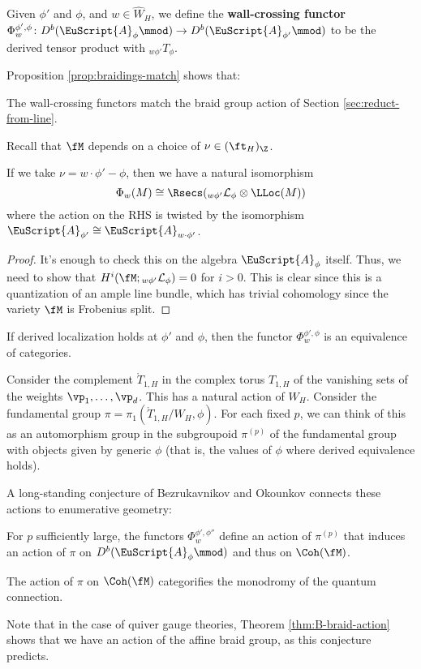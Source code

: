 \begin{definition}
Given $\phi'$ and $\phi$, and $w\in \widehat{W}_H$, we define the {\bf wall-crossing functor} $\Phi_w^{\phi',\phi}\colon D^b(\EuScript{A}_{\phi}\mmod) \to D^b(\EuScript{A}_{\phi'}\mmod)$ to be the derived tensor product with ${}_{w\phi'}T_{\phi}$.
\end{definition}
Proposition \ref{prop:braidings-match} shows that:
\begin{corollary}\label{cor:braidings-match}
  The wall-crossing functors match the braid group action of Section
  \ref{sec:reduct-from-line}.
\end{corollary}
Recall that $\fM$ depends on a choice of $\nu\in (\ft_H)_{\Z}$.  
\begin{proposition}
If we take $\nu=w\cdot \phi'-\phi$, then we have a natural isomorphism \[\Phi_w(M)\cong\Rsecs({}_{w\phi'}\mathcal{L}_{\phi}\otimes \LLoc(M))\] where the action on the RHS is twisted by the isomorphism $\EuScript{A}_{\phi'}\cong \EuScript{A}_{w\cdot \phi'}$.  
\end{proposition}
\begin{proof}
It's enough to check this on the algebra $\EuScript{A}_{\phi}$ itself. Thus, we need to show that $H^i(\fM;{}_{w\phi'}\mathcal{L}_{\phi})=0$ for $i>0$.  This is clear since this is a quantization of an ample line bundle, which has trivial cohomology since the variety $\fM$ is Frobenius split.
\end{proof}

\begin{corollary}
If derived localization holds at $\phi'$ and $\phi$, then the functor $\Phi_w^{\phi',\phi}$ is an equivalence of categories. 
\end{corollary}
Consider the complement $\mathring{T}_{1,H}$ in the complex torus $T_{1,H}$ of the vanishing sets of the weights $\vp_1,\dots, \vp_d$.  This has a natural action of $W_H$.  Consider the fundamental group $\pi=\pi_1(\mathring{T}_{1,H}/W_H,\phi)$.  For each fixed $p$, we can think of this as an automorphism group in the subgroupoid $\pi^{(p)}$ of the fundamental group with objects given by generic $\phi$ (that is, the values of $\phi$ where derived equivalence holds).  

A long-standing conjecture of Bezrukavnikov and Okounkov connects these actions to enumerative geometry:
\begin{conjecture}\label{conj:BO}
For $p$ sufficiently large,  the functors $\Phi_w^{\phi',\phi''}$  define an action of $\pi^{(p)}$ that induces an action of $\pi$ on $D^b(\EuScript{A}_{\phi}\mmod)$ and thus on $\Coh(\fM)$.

The action of $\pi$ on $\Coh(\fM)$ categorifies the monodromy of the quantum connection.
\end{conjecture}
Note that in the case of quiver gauge theories, Theorem \ref{thm:B-braid-action} shows that we have an action of the affine braid group, as this conjecture predicts.

